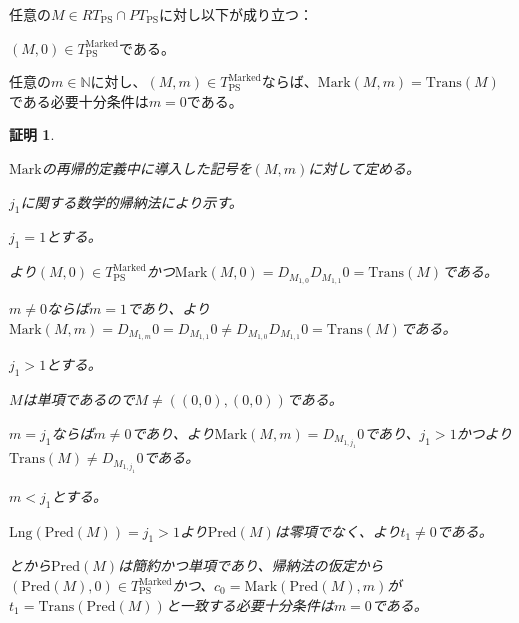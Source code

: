 \documentclass[dvipdfmx,uplatex]{jsarticle}
\theoremstyle{customnonumberbreakfortheorem}
\theoremstyle{customnonumberbreakforproof}
\newtheorem{hideableproof}{証明}
\begin{document}
\begin{corollary}\label{左端第1基点のMarkの基本性質}
	任意の\(M \in RT_{\textrm{PS}} \cap PT_{\textrm{PS}}\)に対し以下が成り立つ：
	\begin{penumerate}
		\item \((M,0) \in T_{\textrm{PS}}^{\textrm{Marked}}\)である。
		\item 任意の\(m \in \mathbb{N}\)に対し、\((M,m) \in T_{\textrm{PS}}^{\textrm{Marked}}\)ならば、\(\textrm{Mark}(M,m) = \textrm{Trans}(M)\)である必要十分条件は\(m = 0\)である。
	\end{penumerate}
\end{corollary}

\begin{hideableproof}
	\begin{indented}
		\item \(\textrm{Mark}\)の再帰的定義中に導入した記号を\((M,m)\)に対して定める。
		\item \(j_1\)に関する数学的帰納法により示す。
		\item \(j_1 = 1\)とする。
		\begin{indented}
			\item {}より\((M,0) \in T_{\textrm{PS}}^{\textrm{Marked}}\)かつ\(\textrm{Mark}(M,0) = D_{M_{1,0}} D_{M_{1,1}} 0 = \textrm{Trans}(M)\)である。
			\item \(m \neq 0\)ならば\(m = 1\)であり、より\(\textrm{Mark}(M,m) = D_{M_{1,m}} 0 = D_{M_{1,1}} 0 \neq D_{M_{1,0}} D_{M_{1,1}} 0 = \textrm{Trans}(M)\)である。
		\end{indented}
		\item \(j_1 > 1\)とする。
		\begin{indented}
			\item \(M\)は単項であるので\(M \neq ((0,0),(0,0))\)である。
			\item \(m = j_1\)ならば\(m \neq 0\)であり、より\(\textrm{Mark}(M,m) = D_{M_{1,j_1}} 0\)であり、\(j_1 > 1\)かつより\(\textrm{Trans}(M) \neq D_{M_{1,j_1}} 0\)である。
			\item \(m < j_1\)とする。
			\begin{indented}
				\item \(\textrm{Lng}(\textrm{Pred}(M)) = j_1 > 1\)より\(\textrm{Pred}(M)\)は零項でなく、より\(t_1 \neq 0\)である。
				\item {}とから\(\textrm{Pred}(M)\)は簡約かつ単項であり、帰納法の仮定から\((\textrm{Pred}(M),0) \in T_{\textrm{PS}}^{\textrm{Marked}}\)かつ、\(c_0 = \textrm{Mark}(\textrm{Pred}(M),m)\)が\(t_1 = \textrm{Trans}(\textrm{Pred}(M))\)と一致する必要十分条件は\(m = 0\)である。

\end{indented}
\end{indented}
\end{indented}
\end{hideableproof}
\end{document}
